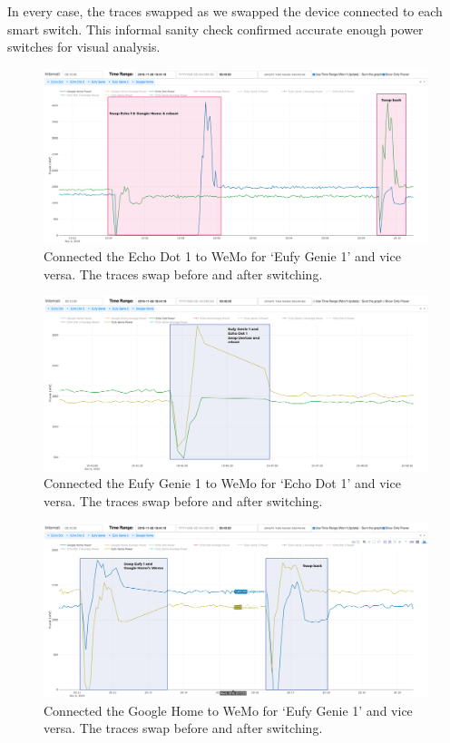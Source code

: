 In every case, the traces swapped as we swapped the device connected to each smart switch. This informal sanity check confirmed accurate enough power switches for visual analysis.

\begin{figure}[H]
    \centering
    \includegraphics[width=1\textwidth]{figures/swapEcho1Home.png}
    \caption{Connected the Echo Dot 1 to WeMo for `Eufy Genie 1' and vice versa. The traces swap before and after switching.}
    \label{fig:swapEcho1Home}
\end{figure}

\begin{figure}[H]
    \centering
    \includegraphics[width=1\textwidth]{figures/swapEufy1Echo1.png}
    \caption{Connected the Eufy Genie 1 to WeMo for `Echo Dot 1' and vice versa. The traces swap before and after switching.}
    \label{fig:swapEufy1Echo1}
\end{figure}

\begin{figure}[H]
    \centering
    \includegraphics[width=1\textwidth]{figures/swapEufy1Home.png}
    \caption{Connected the Google Home to WeMo for `Eufy Genie 1' and vice versa. The traces swap before and after switching.}
    \label{fig:swapEufy1Home}
\end{figure}

